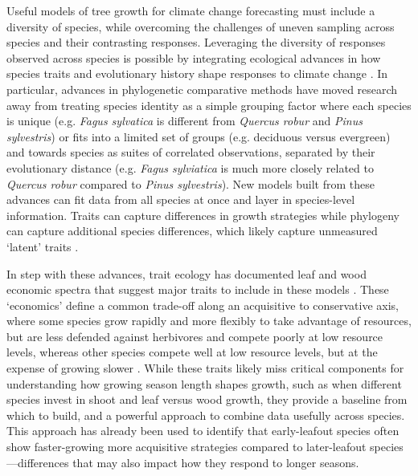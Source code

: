 \documentclass[11pt]{article}
\newcommand{\R}[1]{\label{#1}\linelabel{#1}}
\begin{document}
\R{startframework}Useful models of tree growth for climate change forecasting must include a diversity of species, while overcoming the challenges of uneven sampling across species and their contrasting responses. Leveraging the diversity of responses observed across species is possible by integrating ecological advances in how species traits and evolutionary history shape responses to climate change \citep{cornwell2017phylogenetic,harmonebook}. In particular, advances in phylogenetic comparative methods \citep{Webb:2002or} have moved research away from treating species identity as a simple grouping factor where each species is unique (e.g. \emph{Fagus sylvatica} is different from \emph{Quercus robur} and \emph{Pinus sylvestris}) or fits into a limited set of groups (e.g. deciduous versus evergreen) and towards species as suites of correlated observations, separated by their evolutionary distance (e.g. \emph{Fagus sylviatica} is much more closely related to \emph{Quercus robur} compared to \emph{Pinus sylvestris}). New models built from these advances can fit data from all species at once and layer in species-level information.  Traits can capture differences in growth strategies while phylogeny can capture additional species differences, which likely capture unmeasured `latent' traits \citep[][]{pearse2019interaction,morales2024phylogenetic}. %

In step with these advances, trait ecology has documented leaf and wood economic spectra that suggest major traits to include in these models \citep[with related databases of these traits often available,][]{Chave2009,diaz2016}. These `economics' define a common trade-off along an acquisitive to conservative axis, where some species grow rapidly and more flexibly to take advantage of resources, but are less defended against herbivores and compete poorly at low resource levels, whereas other species compete well at low resource levels, but at the expense of growing slower  \citep[][]{Grime:1977sw,Chave2009,diaz2016}. While these traits likely miss critical components for understanding how growing season length shapes growth, such as when different species invest in shoot and leaf versus wood growth, they provide a baseline from which to build, and a powerful approach to combine data usefully across species. This approach has already been used to identify that early-leafout species often show faster-growing more acquisitive strategies compared to later-leafout species \citep[reviewed in][]{cleland2024effects}---differences that may also impact how they respond to longer seasons. 
\end{document}

